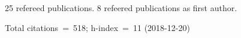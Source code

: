 25 refereed publications. 8 refeered publications as first author.

Total citations~=~518; h-index~=~11 (2018-12-20)